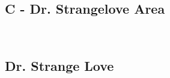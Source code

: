 \begin{multicols}{2}
		\section{C - Dr. Strangelove Area}\label{sa:Dr. Strangelove Area}
	\begin{minipage}{\columnwidth}
	\
	\end{minipage}
	
			\begin{minipage}{\columnwidth}
			\subsection*{Dr. Strange Love}\label{bf:Dr. Strange Love}
			\
			
			\end{minipage}
			
\end{multicols}
\clearpage